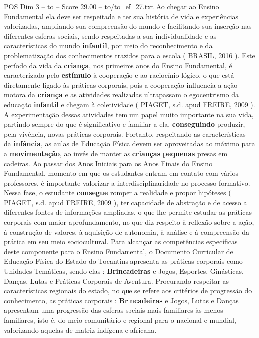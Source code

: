 \begin{textsample}{POS Dim 3 – to – Score 29.00 – to/to\_ef\_27.txt}
Ao chegar ao Ensino Fundamental ela deve ser respeitada e ter sua história de vida e experiências valorizadas, ampliando sua compreensão do mundo e facilitando sua inserção nas diferentes esferas sociais, sendo respeitadas a sua individualidade e as características do mundo \textbf{infantil}, por meio do reconhecimento e da problematização dos conhecimentos trazidos para a escola ( BRASIL, 2016 ).
Este período da vida da \textbf{criança}, nos primeiros anos do Ensino Fundamental, é caracterizado pelo \textbf{estímulo} à cooperação e ao raciocínio lógico, o que está diretamente ligado às práticas corporais, pois a cooperação influencia a ação motora da \textbf{criança} e as atividades realizadas ultrapassam o egocentrismo da educação \textbf{infantil} e chegam à coletividade ( PIAGET, s.d. apud FREIRE, 2009 ).
A experimentação dessas atividades tem um papel muito importante na sua vida, partindo sempre do que é significativo e familiar a ela, \textbf{conseguindo} produzir, pela vivência, novas práticas corporais.
Portanto, respeitando as características da \textbf{infância}, as aulas de Educação Física devem ser aproveitadas ao máximo para a \textbf{movimentação}, ao invés de manter as \textbf{crianças} \textbf{pequenas} presas em cadeiras.
Ao passar dos Anos Iniciais para os Anos Finais do Ensino Fundamental, momento em que os estudantes entram em contato com vários professores, é importante valorizar a interdisciplinaridade no processo formativo.
Nessa fase, o estudante \textbf{consegue} romper a realidade e propor hipóteses ( PIAGET, s.d. apud FREIRE, 2009 ), ter capacidade de abstração e de acesso a diferentes fontes de informações ampliadas, o que lhe permite estudar as práticas corporais com maior aprofundamento, no que diz respeito à reflexão sobre a ação, à construção de valores, à aquisição de autonomia, à análise e à compreensão da prática em seu meio sociocultural.
Para alcançar as competências específicas deste componente para o Ensino Fundamental, o Documento Curricular de Educação Física do Estado do Tocantins apresenta as práticas corporais como Unidades Temáticas, sendo elas : \textbf{Brincadeiras} e Jogos, Esportes, Ginásticas, Danças, Lutas e Práticas Corporais de Aventura.
Procurando respeitar as características regionais do estado, no que se refere aos critérios de progressão do conhecimento, as práticas corporais : \textbf{Brincadeiras} e Jogos, Lutas e Danças apresentam uma progressão das esferas sociais mais familiares às menos familiares, isto é, do meio comunitário e regional para o nacional e mundial, valorizando aquelas de matriz indígena e africana.

\end{textsample}

